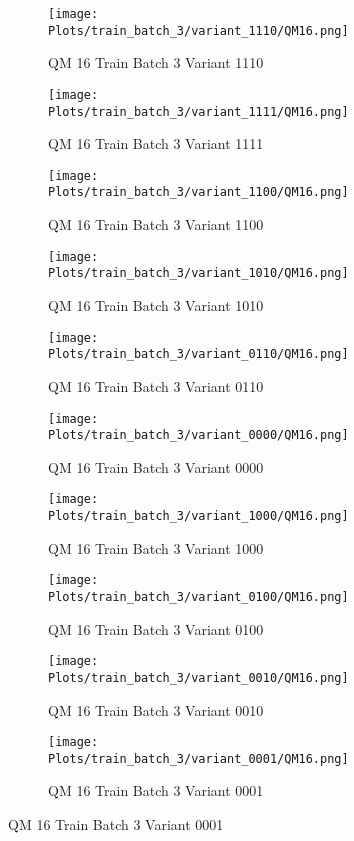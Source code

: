 \documentclass{DissertateFigs}
\begin{document}
\begin{figure}[t!]
    \begin{subfigure}{0.33\textwidth}
    \texttt{[image: Plots/train\_batch\_3/variant\_1110/QM16.png]}
    \caption{QM 16 Train Batch 3 Variant 1110}
    \end{subfigure}
    \begin{subfigure}{0.33\textwidth}
    \texttt{[image: Plots/train\_batch\_3/variant\_1111/QM16.png]}
    \caption{QM 16 Train Batch 3 Variant 1111}
    \end{subfigure}

\medskip

    \begin{subfigure}{0.33\textwidth}
    \texttt{[image: Plots/train\_batch\_3/variant\_1100/QM16.png]}
    \caption{QM 16 Train Batch 3 Variant 1100}
    \end{subfigure}
    \begin{subfigure}{0.33\textwidth}
    \texttt{[image: Plots/train\_batch\_3/variant\_1010/QM16.png]}
    \caption{QM 16 Train Batch 3 Variant 1010}
    \end{subfigure}

\medskip

    \begin{subfigure}{0.33\textwidth}
    \texttt{[image: Plots/train\_batch\_3/variant\_0110/QM16.png]}
    \caption{QM 16 Train Batch 3 Variant 0110}
    \end{subfigure}
    \begin{subfigure}{0.33\textwidth}
    \texttt{[image: Plots/train\_batch\_3/variant\_0000/QM16.png]}
    \caption{QM 16 Train Batch 3 Variant 0000}
    \end{subfigure}

\medskip

    \begin{subfigure}{0.33\textwidth}
    \texttt{[image: Plots/train\_batch\_3/variant\_1000/QM16.png]}
    \caption{QM 16 Train Batch 3 Variant 1000}
    \end{subfigure}
    \begin{subfigure}{0.33\textwidth}
    \texttt{[image: Plots/train\_batch\_3/variant\_0100/QM16.png]}
    \caption{QM 16 Train Batch 3 Variant 0100}
    \end{subfigure}

\medskip

    \begin{subfigure}{0.33\textwidth}
    \texttt{[image: Plots/train\_batch\_3/variant\_0010/QM16.png]}
    \caption{QM 16 Train Batch 3 Variant 0010}
    \end{subfigure}
    \begin{subfigure}{0.33\textwidth}
    \texttt{[image: Plots/train\_batch\_3/variant\_0001/QM16.png]}
    \caption{QM 16 Train Batch 3 Variant 0001}
    \end{subfigure}


\end{figure}
\end{document}
